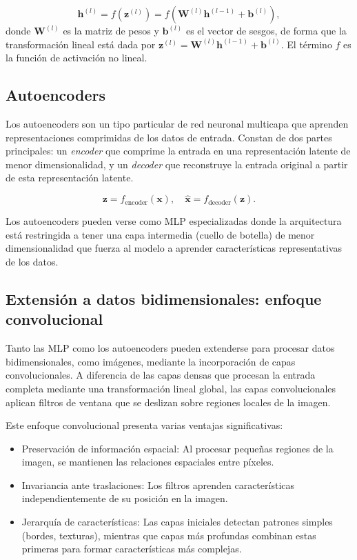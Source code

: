 \begin{equation}
\mathbf{h}^{(l)} = f(\mathbf{z}^{(l)}) = f(\mathbf{W}^{(l)}\mathbf{h}^{(l-1)} + \mathbf{b}^{(l)}),
\end{equation}
donde $\mathbf{W}^{(l)}$ es la matriz de pesos  y $\mathbf{b}^{(l)}$ es el vector de sesgos, de forma que la transformación lineal está dada por $\mathbf{z}^{(l)} = \mathbf{W}^{(l)}\mathbf{h}^{(l-1)} + \mathbf{b}^{(l)}$. El término $f$ es la función de activación no lineal.

\subsection{Autoencoders}

Los autoencoders son un tipo particular de red neuronal multicapa que aprenden representaciones comprimidas de los datos de entrada. Constan de dos partes principales: un \textit{encoder} que comprime la entrada en una representación latente de menor dimensionalidad, y un \textit{decoder} que reconstruye la entrada original a partir de esta representación latente.

\begin{equation}
\mathbf{z} = f_{\text{encoder}}(\mathbf{x}), \quad \hat{\mathbf{x}} = f_{\text{decoder}}(\mathbf{z}).
\end{equation}

Los autoencoders pueden verse como MLP especializadas donde la arquitectura está restringida a tener una capa intermedia (cuello de botella) de menor dimensionalidad que fuerza al modelo a aprender características representativas de los datos.

\subsection{Extensión a datos bidimensionales: enfoque convolucional}

Tanto las MLP como los autoencoders pueden extenderse para procesar datos bidimensionales, como imágenes, mediante la incorporación de capas convolucionales. A diferencia de las capas densas que procesan la entrada completa mediante una transformación lineal global, las capas convolucionales aplican filtros de ventana que se deslizan sobre regiones locales de la imagen.

Este enfoque convolucional presenta varias ventajas significativas:
\begin{itemize}
    \item Preservación de información espacial: Al procesar pequeñas regiones de la imagen, se mantienen las relaciones espaciales entre píxeles.
    \item Invariancia ante traslaciones: Los filtros aprenden características independientemente de su posición en la imagen.
    \item Jerarquía de características: Las capas iniciales detectan patrones simples (bordes, texturas), mientras que capas más profundas combinan estas primeras para formar características más complejas.
\end{itemize}

